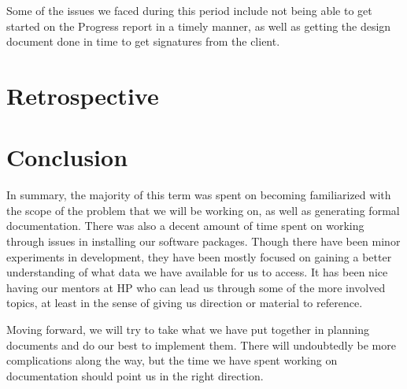\documentclass[draftclsnofoot, onecolumn, compsoc, 10pt]{IEEEtran}
\begin{document}
Some of the issues we faced during this period include not being able to get started on the Progress report in a timely manner, as well as getting the design document done in time to get signatures from the client.




\section{Retrospective}
\bgroup
\def\arraystretch{1.5}
\egroup

\section{Conclusion}
In summary, the majority of this term was spent on becoming familiarized with the scope of the problem that we will be working on, as well as generating formal documentation.
There was also a decent amount of time spent on working through issues in installing our software packages.
Though there have been minor experiments in development, they have been mostly focused on gaining a better understanding of what data we have available for us to access.
It has been nice having our mentors at HP who can lead us through some of the more involved topics, at least in the sense of giving us direction or material to reference.

Moving forward, we will try to take what we have put together in planning documents and do our best to implement them. There will undoubtedly be more complications along the way, but the time we have spent working on documentation should point us in the right direction.
\end{document}
